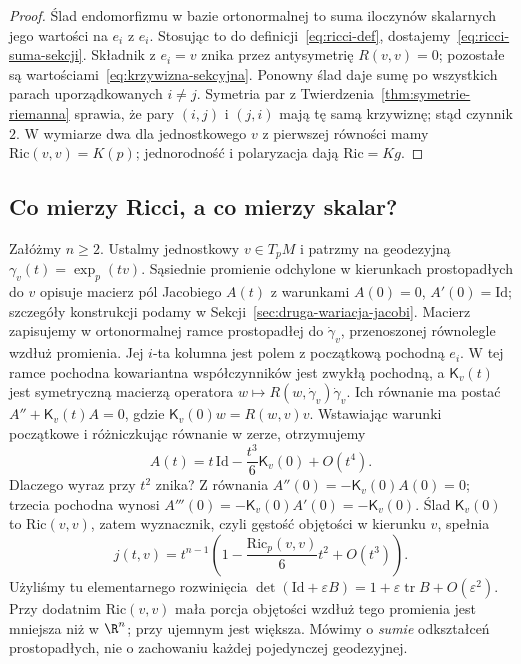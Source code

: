 \begin{proof}
Ślad endomorfizmu w bazie ortonormalnej to suma
iloczynów skalarnych jego wartości na $e_i$ z $e_i$.
Stosując to do definicji~\eqref{eq:ricci-def},
dostajemy~\eqref{eq:ricci-suma-sekcji}. Składnik
z $e_i=v$ znika przez antysymetrię $R(v,v)=0$;
pozostałe są wartościami~\eqref{eq:krzywizna-sekcyjna}.
Ponowny ślad daje sumę po wszystkich parach
uporządkowanych $i\ne j$. Symetria par z
Twierdzenia~\ref{thm:symetrie-riemanna} sprawia,
że pary $(i,j)$ i $(j,i)$ mają tę samą krzywiznę;
stąd czynnik $2$. W wymiarze dwa dla jednostkowego
$v$ z pierwszej równości mamy
$\mathrm{Ric}(v,v)=K(p)$; jednorodność i polaryzacja
dają $\mathrm{Ric}=Kg$.
\end{proof}

\subsection*{Co mierzy Ricci, a co mierzy skalar?}
Załóżmy $n\geq2$. Ustalmy jednostkowy $v\in T_pM$ i patrzmy na geodezyjną
$\gamma_v(t)=\exp_p(tv)$. Sąsiednie promienie odchylone
w kierunkach prostopadłych do $v$ opisuje macierz pól
Jacobiego $A(t)$ z warunkami
$A(0)=0$, $A'(0)=\mathrm{Id}$; szczegóły konstrukcji
podamy w Sekcji~\ref{sec:druga-wariacja-jacobi}.
Macierz zapisujemy w ortonormalnej ramce prostopadłej
do $\dot\gamma_v$, przenoszonej równolegle wzdłuż promienia.
Jej $i$-ta kolumna jest polem z początkową pochodną $e_i$.
W tej ramce pochodna kowariantna współczynników jest zwykłą
pochodną, a $\mathsf K_v(t)$ jest symetryczną macierzą
operatora $w\mapsto R(w,\dot\gamma_v)\dot\gamma_v$.
Ich równanie ma postać
$A''+\mathsf K_v(t)A=0$, gdzie
$\mathsf K_v(0)w=R(w,v)v$. Wstawiając warunki
początkowe i różniczkując równanie w zerze, otrzymujemy
\[
 A(t)=t\,\mathrm{Id}-\frac{t^3}{6}\mathsf K_v(0)+O(t^4).
\]
Dlaczego wyraz przy $t^2$ znika? Z równania
$A''(0)=-\mathsf K_v(0)A(0)=0$; trzecia pochodna
wynosi $A'''(0)=-\mathsf K_v(0)A'(0)=-\mathsf K_v(0)$.
Ślad $\mathsf K_v(0)$ to $\mathrm{Ric}(v,v)$, zatem
wyznacznik, czyli gęstość objętości w kierunku $v$,
spełnia
\begin{equation}\label{eq:ricci-gestosc-malej-kuli}
 j(t,v)=t^{n-1}\left(1-\frac{\mathrm{Ric}_p(v,v)}6t^2
                              +O(t^3)\right).
\end{equation}
Użyliśmy tu elementarnego rozwinięcia
$\det(\mathrm{Id}+\varepsilon B)
=1+\varepsilon\operatorname{tr}B+O(\varepsilon^2)$.
Przy dodatnim $\mathrm{Ric}(v,v)$ mała porcja objętości
wzdłuż tego promienia jest mniejsza niż w $\R^n$;
przy ujemnym jest większa. Mówimy o \emph{sumie}
odkształceń prostopadłych, nie o zachowaniu każdej
pojedynczej geodezyjnej.

